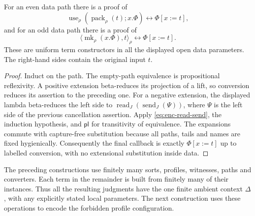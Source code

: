 \begin{lemma}
\label{lem:enc-data-cancellation}
For an even data path there is a proof of
\[
       \operatorname{use}_\rho(\operatorname{pack}_\rho(t);x.\Phi)
                             \leftrightarrow\Phi[x:=t],
\]
and for an odd data path there is a proof of
\[
             \langle\operatorname{mk}_\rho(x.\Phi),t\rangle_\rho
                             \leftrightarrow\Phi[x:=t].
\]
These are uniform term constructors in all the displayed open data
parameters.  The right-hand sides contain the original input $t$.
\end{lemma}
\begin{proof}
Induct on the path.  The empty-path equivalence is propositional
reflexivity.  A positive extension beta-reduces its projection of a lift,
so conversion reduces its assertion to the preceding one.  For a negative
extension, the displayed lambda beta-reduces the left side to
$\operatorname{read}_J(\operatorname{send}_J(\Psi))$, where $\Psi$
is the left side of the previous cancellation assertion.  Apply
\eqref{eq:enc-read-send}, the induction hypothesis, and
$\mathsf{pl}$ for transitivity of equivalence.  The expansions commute
with capture-free substitution because all paths, tails and names are
fixed hygienically.  Consequently the final callback is exactly
$\Phi[x:=t]$ up to labelled conversion, with no extensional substitution
inside data.
\end{proof}

The preceding constructions use finitely many sorts, profiles, witnesses,
paths and converters.  Each term in the remainder is built from finitely
many of their instances.  Thus all the resulting judgments have the one
finite ambient context $\Delta$, with any explicitly stated local
parameters.  The next construction uses these operations to encode the
forbidden profile configuration.
